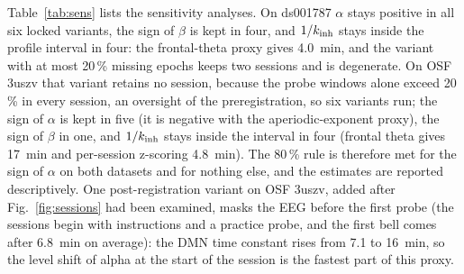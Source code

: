 Table~\ref{tab:sens} lists the sensitivity analyses. On ds001787 $\alpha$ stays positive in all six locked variants, the sign of $\beta$ is kept in four, and $1/k_{\mathrm{inh}}$ stays inside the profile interval in four: the frontal-theta proxy gives 4.0~min, and the variant with at most 20\,\% missing epochs keeps two sessions and is degenerate. On OSF 3uszv that variant retains no session, because the probe windows alone exceed 20\,\% in every session, an oversight of the preregistration, so six variants run; the sign of $\alpha$ is kept in five (it is negative with the aperiodic-exponent proxy), the sign of $\beta$ in one, and $1/k_{\mathrm{inh}}$ stays inside the interval in four (frontal theta gives 17~min and per-session z-scoring 4.8~min). The 80\,\% rule is therefore met for the sign of $\alpha$ on both datasets and for nothing else, and the estimates are reported descriptively. One post-registration variant on OSF 3uszv, added after Fig.~\ref{fig:sessions} had been examined, masks the EEG before the first probe (the sessions begin with instructions and a practice probe, and the first bell comes after 6.8~min on average): the DMN time constant rises from 7.1 to 16~min, so the level shift of alpha at the start of the session is the fastest part of this proxy.

